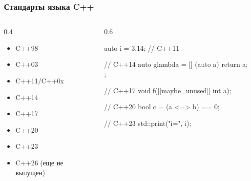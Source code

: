 \documentclass[compress, aspectratio=169]{beamer}
\begin{document}
\begin{frame}[fragile]

    \frametitle{Стандарты языка C++}

    \begin{columns}

        \begin{column}{0.4\textwidth}

            \begin{itemize}

                \item C++98
                \item C++03
                \item C++11/C++0x
                \item C++14
                \item C++17
                \item C++20
                \item C++23
                \item C++26 (еще не выпущен)

            \end{itemize}

        \end{column}

        \begin{column}{0.6\textwidth}

            \begin{myinplacelisting}[minted language=cpp]
auto i = 3.14; // C++11

// C++14
auto glambda = [] (auto a) {
    return a;
};

// C++17
void f([[maybe_unused]] int a);

// C++20
bool c = (a <=> b) == 0;

// C++23
std::print("i={}\n", i);
            \end{myinplacelisting}
        \end{column}

    \end{columns}

\end{frame}
\end{document}
